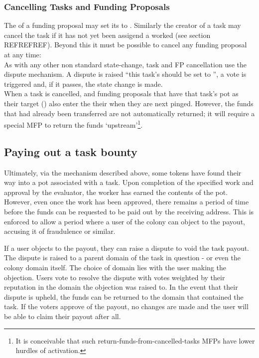\subsubsection{Cancelling Tasks and Funding Proposals}
The  of a funding proposal may set its  to . Similarly the creator of a task may cancel the task if it has not yet been assigend a worked (see section REFREFREF). Beyond this it must be possible to cancel any funding proposal at any time:\\
As with any other non standard state-change, task and FP cancellation use the dispute mechanism. A dispute is raised ``this task's  should be set to '', a vote is triggered and, if it passes, the state change is made.\\
When a task is cancelled, and funding proposals that have that task's pot as their target () also enter the  their  when they are next pinged. However, the funds that had already been transferred are not automatically returned; it will require a special MFP to return the funds `upstream'\footnote{It is conceivable that such return-funds-from-cancelled-tasks MFPs have lower hurdles of activation.}.

\subsection{Paying out a task bounty}\label{sec:claiming-bounty}
Ultimately, via the mechanism described above, some tokens have found their way into a pot associated with a task. Upon completion of the specified work and approval by the evaluator, the worker has earned the contents of the pot. However, even once the work has been approved, there remains a period of time before the funds can be requested to be paid out by the receiving address. This is enforced to allow a period where a user of the colony can object to the payout, accusing it of fraudulence or similar.

If a user objects to the payout, they can raise a dispute to void the task payout. The dispute is raised to a parent domain of the task in question - or even the colony domain itself. The choice of domain lies with the user making the objection. Users vote to resolve the dispute with votes weighted by their reputation in the domain the objection was raised to. In the event that their dispute is upheld, the funds can be returned to the domain that contained the task. If the voters approve of the payout, no changes are made and the user will be able to claim their payout after all.

